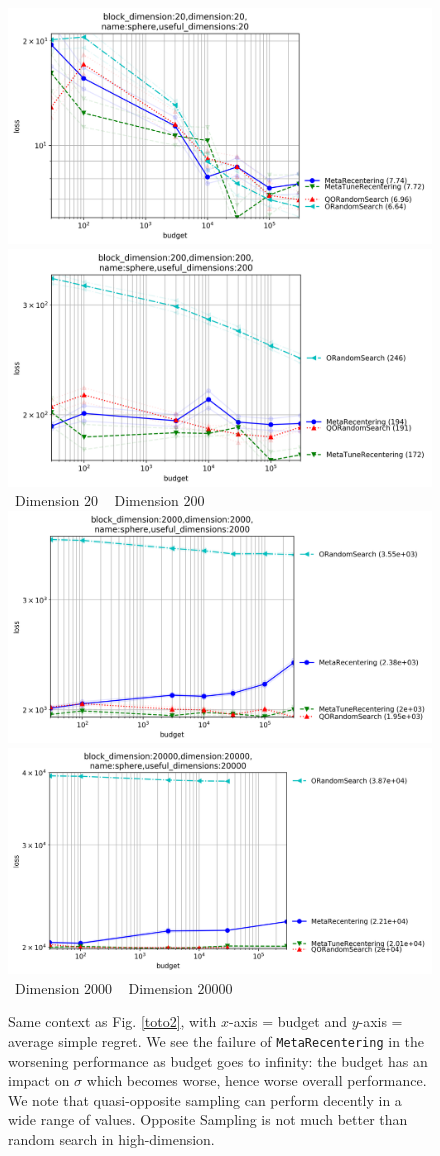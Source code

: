 \begin{figure}[t]
    \centering
\includegraphics[width=.49\textwidth]{sections/appendix/ppsn2020-rescaling/figures/xpresults_block_dimension20,dimension20,namesphere,useful_dimensions20.png}
 \includegraphics[width=.49\textwidth]{sections/appendix/ppsn2020-rescaling/figures/xpresults_block_dimension200,dimension200,namesphere,useful_dimensions200.png}\\
 ~\hfill Dimension $20$ \hfill ~ \hfill Dimension $200$ \hfill ~ \\
  \includegraphics[width=.49\textwidth]{sections/appendix/ppsn2020-rescaling/figures/xpresults_block_dimension2000,dimension2000,namesphere,useful_dimensions2000.png}     \includegraphics[width=.49\textwidth]{sections/appendix/ppsn2020-rescaling/figures/xpresults_block_dimension20000,dimension20000,namesphere,useful_dimensions20000.png}\\
 ~\hfill Dimension $2000$ \hfill ~ \hfill Dimension $20000$ \hfill ~ \\  
 \vspace{-10pt}
    \caption{Same context as Fig. \ref{toto2}, with $x$-axis = budget and $y$-axis = average simple regret. We see the failure of \texttt{MetaRecentering} in the worsening performance as budget goes to infinity: the budget has an impact on $\sigma$ which becomes worse, hence worse overall performance. We note that quasi-opposite sampling can perform decently in a wide range of values. Opposite Sampling is not much better than random search in high-dimension. }
    \label{toto2bis}
\end{figure}
